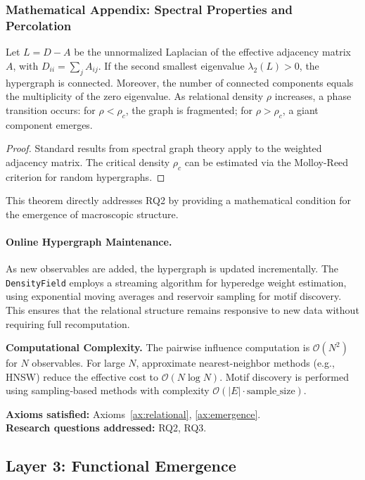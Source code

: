 \subsubsection{Mathematical Appendix: Spectral Properties and Percolation}
\begin{theorem}
\label{thm:spectral}
Let $L = D - A$ be the unnormalized Laplacian of the effective adjacency matrix $A$, with $D_{ii} = \sum_j A_{ij}$. If the second smallest eigenvalue $\lambda_2(L) > 0$, the hypergraph is connected. Moreover, the number of connected components equals the multiplicity of the zero eigenvalue. As relational density $\rho$ increases, a phase transition occurs: for $\rho < \rho_c$, the graph is fragmented; for $\rho > \rho_c$, a giant component emerges.
\end{theorem}
\begin{proof}
Standard results from spectral graph theory \cite{chung1997spectral} apply to the weighted adjacency matrix. The critical density $\rho_c$ can be estimated via the Molloy-Reed criterion for random hypergraphs.
\end{proof}
This theorem directly addresses RQ2 by providing a mathematical condition for the emergence of macroscopic structure.

\paragraph{Online Hypergraph Maintenance.}
As new observables are added, the hypergraph is updated incrementally. The \texttt{DensityField} employs a streaming algorithm for hyperedge weight estimation, using exponential moving averages and reservoir sampling for motif discovery. This ensures that the relational structure remains responsive to new data without requiring full recomputation.

\textbf{Computational Complexity.} The pairwise influence computation is $\mathcal{O}(N^2)$ for $N$ observables. For large $N$, approximate nearest-neighbor methods (e.g., HNSW) reduce the effective cost to $\mathcal{O}(N \log N)$. Motif discovery is performed using sampling‑based methods with complexity $\mathcal{O}(|E| \cdot \text{sample\_size})$.

\textbf{Axioms satisfied:} Axioms~\ref{ax:relational}, \ref{ax:emergence}. \\
\textbf{Research questions addressed:} RQ2, RQ3.

\subsection{Layer 3: Functional Emergence}
\label{subsec:layer3}

